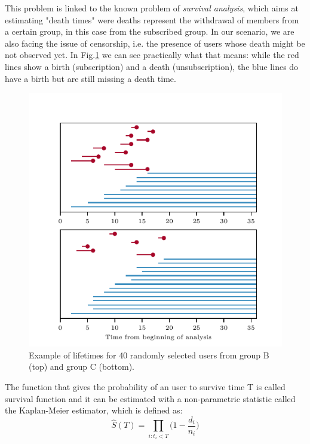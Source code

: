 \documentclass[paper=a4, fontsize=10pt]{report}
\begin{document}
This problem is linked to the known problem of \textit{survival analysis}, which aims at estimating "death times" were deaths represent the withdrawal of members from a certain group,
in this case from the subscribed group. In our scenario, we are also facing the issue of censorship, i.e. the presence of users whose death might be not observed yet. In Fig.\ref{fig:lifetimes} we can see practically what that means: while the red lines show a birth (subscription)
and a death (unsubscription), the blue lines do have a birth but are still missing a death time.
\begin{figure}[htpb!]
\centering
\includegraphics[width=.99\columnwidth]{lifetime.pdf}
\caption{Example of lifetimes for 40 randomly selected users from group B (top) and group C (bottom).}
\label{fig:lifetimes}
\end{figure}

The function that gives the probability of an user to survive time T is called survival function and it can be estimated
with a non-parametric statistic called the Kaplan-Meier estimator, which is defined as:
\begin{equation}
 \hat{S}(T) = \prod_{i: t_{i} < T} \Big(1 - \frac{d_{i}}{n_{i}} \Big)
\end{equation}
\end{document}
